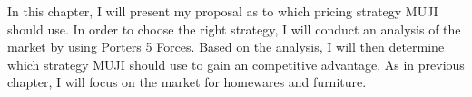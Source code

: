 In this chapter, I will present my proposal as to which pricing strategy MUJI should use. In order to choose the right strategy, I will conduct an analysis of the market by using Porters 5 Forces. Based on the analysis, I will then determine which strategy MUJI should use to gain an competitive advantage. As in previous chapter, I will focus on the market for homewares and furniture. 